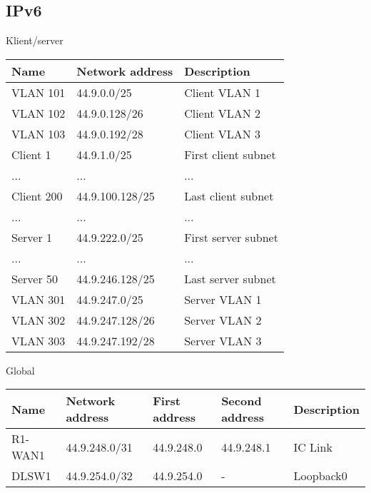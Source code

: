 \documentclass[czech,master,dept460,male,cpp,cpdeclaration]{diploma}
\begin{document}

\subsection{IPv6}
\label{subsec:Sec042}
\noindent Klient/server
\begin{center}
	\begin{tabular}{l|l|l}
		Name & Network address & Description \\
		\hline
		VLAN 101 & 44.9.0.0/25 & Client VLAN 1\\
		VLAN 102 & 44.9.0.128/26 & Client VLAN 2\\
		VLAN 103 & 44.9.0.192/28 & Client VLAN 3\\
		Client 1 & 44.9.1.0/25 & First client subnet\\
		... & ... & ...\\
		Client 200 & 44.9.100.128/25 & Last client subnet\\
		... & ... & ...\\
		Server 1 & 44.9.222.0/25 & First server subnet\\
		... & ... & ...\\
		Server 50 & 44.9.246.128/25 & Last server subnet\\
		VLAN 301 & 44.9.247.0/25 & Server VLAN 1\\
		VLAN 302 & 44.9.247.128/26 & Server VLAN 2\\
		VLAN 303 & 44.9.247.192/28 & Server VLAN 3\\
	\end{tabular}
\end{center}

\noindent Global
\begin{center}
	\begin{tabular}{l|l|l|l|l}
		Name & Network address & First address & Second address & Description \\
		\hline
		R1-WAN1 & 44.9.248.0/31 & 44.9.248.0 & 44.9.248.1 & IC Link \\
		\hline
		DLSW1 & 44.9.254.0/32 & 44.9.254.0 & - & Loopback0 \\
	\end{tabular}
\end{center}


\end{document}
